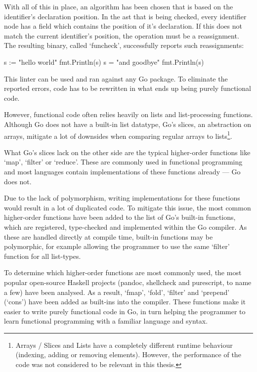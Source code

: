 With all of this in place, an algorithm has been chosen that is based on the identifier's
declaration position. In the \gls{ast} that is being checked, every identifier node has a field
which contains the position of it's declaration. If this does not match the current identifier's
position, the operation must be a reassignment.
The resulting binary, called `funcheck', successfully reports such reassignments:

\begin{gocode}
s := "hello world"
fmt.Println(s)
s = "and goodbye"
fmt.Println(s)
\end{gocode}


This linter can be used and ran against any Go package. To eliminate the reported errors,
code has to be rewritten in what ends up being purely functional code.

However, functional code often relies heavily on lists and list-processing functions.
Although Go does not have a built-in list datatype, Go's slices, an abstraction on arrays,
mitigate a lot of downsides when comparing regular arrays to lists\footnote{Arrays / Slices
and Lists have a completely different runtime behaviour (indexing, adding or removing elements).
However, the performance of the code was not considered to be relevant in this thesis.}.

What Go's slices lack on the other side are the typical higher-order functions like `map',
`filter' or `reduce'. These are commonly used in functional programming and most languages
contain implementations of these functions already --- Go does not.

Due to the lack of polymorphism, writing implementations for these functions
would result in a lot of duplicated code. To mitigate this issue, the most
common higher-order functions have been added to the list of Go's built-in functions,
which are registered, type-checked and implemented within the Go compiler.
As these are handled directly at compile time, built-in functions may be polymorphic, for
example allowing the programmer to use the same `filter' function for all list-types.

To determine which higher-order functions are most commonly used, the most popular
open-source Haskell projects (pandoc, shellcheck and purescript, to name a few) have
been analysed. As a result, `fmap', `fold', `filter' and `prepend'
(`cons') have been added as built-ins into the compiler.
These functions make it easier to write purely functional code in Go, in turn helping
the programmer to learn functional programming with a familiar language and syntax.

